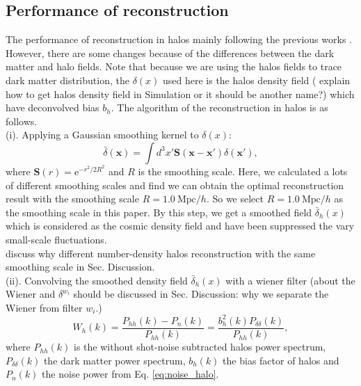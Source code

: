 \subsection{\label{perf_of_recon}Performance of reconstruction }
The performance of reconstruction in halos mainly following the previous works \citep{2012arXiv1202.5804P,2016PhRvD..93j3504Z}. 
However, there are some changes because
of the differences between the dark matter and halo fields. 
Note that because we are using the halos fields to trace dark matter 
distribution, the $\delta(x)$ used here is the halos density field 
({\color{red} explain how to get halos density field in Simulation or it should be another name?})
which have deconvolved bias $b_{h}$.
The algorithm of the reconstruction in halos is as follows.\\
(i). Applying a Gaussian smoothing kernel to $\delta(x)$:
\begin{equation}
\bar{\delta}(\mathbf{x})=\int d^{3}x'\mathbf{S}(\mathbf{x}-\mathbf{x}')\delta	(\mathbf{x}'),
\label{equ:smooth kernel}
\end{equation}
where $\mathbf{S}(r)=\mathrm{e}^{-r^{2}/2R^{2}}$ and $R$ is the smoothing
scale. Here, we calculated a lots
of different smoothing scales and find we can obtain the optimal 
reconstruction result with the smoothing scale $R=1.0\ \mathrm{Mpc}/h$. 
So we select $R=1.0\ \mathrm{Mpc}/h$ as the smoothing scale in this paper. 
By this step, we get a smoothed
field $\bar{\delta}_{h}(x)$ which {\color{blue}is considered as} the
cosmic density field and have been suppressed the vary small-scale 
fluctuations.\\
{\color{red} discuss why different number-density halos reconstruction
with the same smoothing scale in Sec. Discussion.}\\
(ii). Convolving the smoothed density field 
$\bar{\delta}_{h}(x)$ with a wiener filter 
{\color{red} (about the Wiener and $\delta^{w_{i}}$ should be discussed in 
Sec. Discussion: why we separate the Wiener from filter $w_i$.)}
\begin{equation}
W_{h}(k)=\frac{P_{hh}(k)-P_{n}(k)}{P_{hh}(k)}
=\frac{b_{h}^2(k)P_{\delta\delta}(k)}{P_{hh}(k)},
\label{eq:nbar_filter}
\end{equation}
where $P_{hh}(k)$ is the without shot-noise subtracted halos power spectrum,
$P_{\delta\delta}(k)$ the dark matter power spectrum, $b_{h}(k)$
the bias factor of halos and $P_{n}(k)$ the noise power from 
Eq. \ref{eq:noise_halo}.\\
